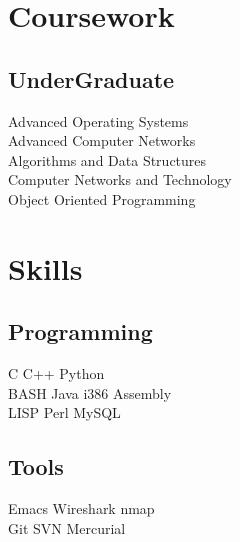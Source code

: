 \documentclass[letterpaper]{deedy-resume} %
\begin{document}
\begin{minipage}[t]{0.33\textwidth}

\section{Coursework}

\subsection{UnderGraduate}

Advanced Operating Systems \\
Advanced Computer Networks \\
Algorithms and Data Structures \\
Computer Networks and Technology \\
Object Oriented Programming \\

\sectionspace %


\section{Skills}

\subsection{Programming}

C \textbullet{} C++ \textbullet{} Python \\
BASH \textbullet{} Java \textbullet{} i386 Assembly \\
LISP \textbullet{} Perl \textbullet{} MySQL

\sectionspace %

\subsection{Tools}

Emacs \textbullet{} Wireshark \textbullet{} nmap \\
Git \textbullet{} SVN \textbullet{} Mercurial


\end{minipage} %
\end{document}
